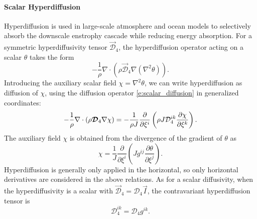 \documentclass{report}
\begin{document}
\paragraph{Scalar Hyperdiffusion} Hyperdiffusion is used in large-scale atmosphere and ocean models to selectively absorb the downscale enstrophy cascade while reducing energy absorption.  For a symmetric hyperdiffusivity tensor $\vec{\mathcal{D}}_4$, the hyperdiffusion operator acting on a scalar $\theta$ takes the form 
\begin{equation}\label{e:hyperdiff_scalar}
    -\frac{1}{\rho} \nabla \cdot \left(\rho \vec{\mathcal{D}}_4 \nabla (\nabla^2 \theta)\right).
\end{equation}
Introducing the auxiliary scalar field $\chi = \nabla^2 \theta$, we can write hyperdiffusion as diffusion of $\chi$, using the diffusion operator \eqref{e:scalar_diffusion} in generalized coordinates:
\begin{equation}
 -\frac{1}{\rho} \nabla \cdot (\rho \vec{\mathcal{D}}_4 \nabla  \chi) \\
 = - \frac{1}{\rho J} \frac{\partial}{\partial \xi^i} \left(\rho J \mathcal{D}_4^{ik} \frac{\partial \chi}{\partial \xi^k}\right).
\end{equation}
The auxiliary field $\chi$ is obtained from the divergence of the gradient of $\theta$ as 
\begin{equation}
    \chi = \frac{1}{J} \frac{\partial}{\partial\xi^i} \left( J  g^{ij} \frac{\partial\theta}{\partial\xi^j} \right).
\end{equation}
Hyperdiffusion is generally only applied in the horizontal, so only horizontal derivatives are considered in the above relations. As for a scalar diffusivity, when the hyperdiffusivity is a scalar with $\vec{\mathcal{D}}_4 = \mathcal{D}_4 \vec{I}$, the contravariant hyperdiffusion tensor is
\[
\mathcal{D}_4^{ik} = \mathcal{D}_4 g^{ik}.
\]
\end{document}

